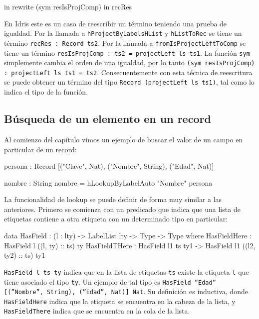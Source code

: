 \begin{code}
in rewrite (sym resIsProjComp) in recRes
\end{code}

En Idris este es un caso de reescribir un término teniendo una prueba de igualdad. Por la llamada a \texttt{hProjectByLabelsHList} y \texttt{hListToRec} se tiene un término \texttt{recRes : Record ts2}. Por la llamada a \texttt{fromIsProjectLeftToComp} se tiene un término \texttt{resIsProjComp : ts2 = projectLeft ls ts1}. La función \texttt{sym} simplemente cambia el orden de una igualdad, por lo tanto \texttt{(sym resIsProjComp) : projectLeft ls ts1 = ts2}. Consecuentemente con esta técnica de reescritura se puede obtener un término del tipo \texttt{Record (projectLeft ls ts1)}, tal como lo indica el tipo de la función.

\subsection{Búsqueda de un elemento en un record}

Al comienzo del capítulo vimos un ejemplo de buscar el valor de un campo en particular de un record:

\begin{code}
persona : Record [("Clave", Nat), ("Nombre", String),
  ("Edad", Nat)]

nombre : String
nombre = hLookupByLabelAuto "Nombre" persona
\end{code}

La funcionalidad de lookup se puede definir de forma muy similar a las anteriores. Primero se comienza con un predicado que indica que una lista de etiquetas contiene a otra etiqueta con un determinado tipo en particular:

\begin{code}
data HasField : (l : lty) -> LabelList lty ->
  Type -> Type where
  HasFieldHere : HasField l ((l, ty) :: ts) ty
  HasFieldTHere : HasField l1 ts ty1 ->
    HasField l1 ((l2, ty2) :: ts) ty1
\end{code}

\texttt{HasField l ts ty} indica que en la lista de etiquetas \texttt{ts} existe la etiqueta \texttt{l} que tiene asociado el tipo \texttt{ty}. Un ejemplo de tal tipo es \texttt{HasField ''Edad'' [(''Nombre'', String), (''Edad'', Nat)] Nat}. Su definición es inductiva, donde \texttt{HasFieldHere} indica que la etiqueta se encuentra en la cabeza de la lista, y \texttt{HasFieldThere} indica que se encuentra en la cola de la lista.

